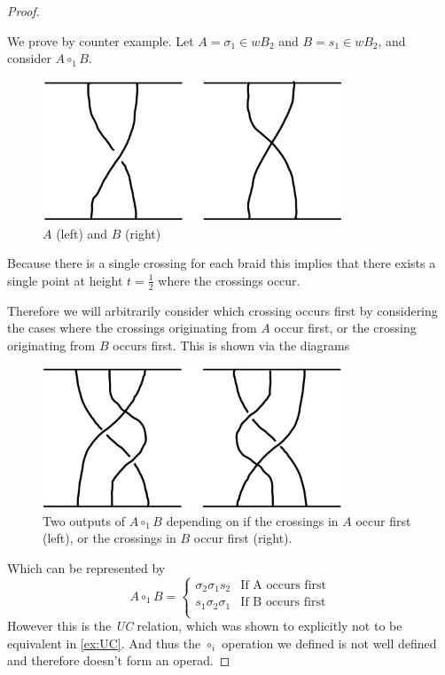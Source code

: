 \begin{proof} \label{pr:counter}

We prove by counter example. 
Let \( A = \sigma_1 \in wB_2 \) and \( B = s_1 \in wB_2 \), and consider \( A \circ_1 B \). 

\begin{figure}[H]
    \centering
    \includegraphics[width=0.8\textwidth]{images/welded_braids/3_welded_proof_values.png}
    \caption{\( A \) (left) and \( B \) (right)}
\end{figure}

Because there is a single crossing for each braid this implies that there exists a single point at height \( t = \frac{1}{2} \) where the crossings occur. 

Therefore we will arbitrarily consider which crossing occurs first by considering the cases where the crossings originating from \( A \) occur first, or the crossing originating from \( B \) occurs first. 
This is shown via the diagrams

\begin{figure}[H]
    \centering
    \includegraphics[width=0.8\textwidth]{images/welded_braids/4_welded_proof.png}
    \caption{Two outputs of \( A \circ_1 B\) depending on if the crossings in \( A \) occur first (left), or the crossings in \( B \) occur first (right).}
    \label{fig:UC}
\end{figure}

Which can be represented by
\[
A \circ_1 B =
\begin{cases}
\sigma_2 \sigma_1 s_2 &\text{If A occurs first} \\
s_1 \sigma_2 \sigma_1 &\text{If B occurs first} \\
\end{cases}
\]
However this is the \emph{UC} relation, which was shown to explicitly not to be equivalent in \cref{ex:UC}.
And thus the \( \circ_i \) operation we defined is not well defined and therefore doesn't form an operad.
\end{proof}


